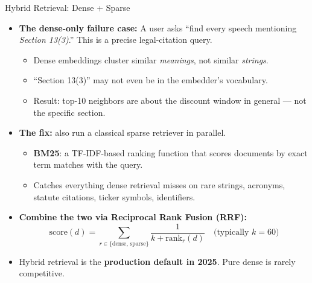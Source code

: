 \documentclass[10pt,english,aspectratio=169]{beamer}
\begin{document}
\begin{frame}{Hybrid Retrieval: Dense + Sparse}
\begin{itemize}
\item \textbf{The dense-only failure case:} A user asks ``find every speech mentioning \emph{Section 13(3)}.'' This is a precise legal-citation query.
\begin{itemize}
    \item Dense embeddings cluster similar \emph{meanings}, not similar \emph{strings}.
    \item ``Section 13(3)'' may not even be in the embedder's vocabulary.
    \item Result: top-10 neighbors are about the discount window in general --- not the specific section.
\end{itemize}

\medskip
\item \textbf{The fix:} also run a classical sparse retriever in parallel.
\begin{itemize}
    \item \textbf{BM25}: a TF-IDF-based ranking function that scores documents by exact term matches with the query.
    \item Catches everything dense retrieval misses on rare strings, acronyms, statute citations, ticker symbols, identifiers.
\end{itemize}

\medskip
\item \textbf{Combine the two via Reciprocal Rank Fusion (RRF):}
\[
\text{score}(d) = \sum_{r \in \{\text{dense, sparse}\}} \frac{1}{k + \text{rank}_r(d)}
\quad \text{(typically } k = 60 \text{)}
\]

\medskip
\item Hybrid retrieval is the \textbf{production default in 2025}. Pure dense is rarely competitive.
\end{itemize}
\end{frame}
\end{document}
